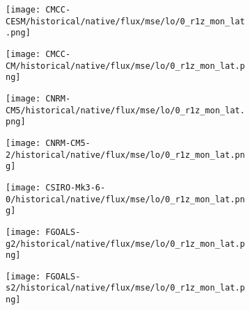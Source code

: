 \documentclass[preview]{standalone}
\begin{document}
\begin{figure}
  \begin{subfigure}[t]{\textwidth}
    \texttt{[image: CMCC-CESM/historical/native/flux/mse/lo/0\_r1z\_mon\_lat.png]}
  \end{subfigure}
\end{figure}

\begin{figure}
  \begin{subfigure}[t]{\textwidth}
    \texttt{[image: CMCC-CM/historical/native/flux/mse/lo/0\_r1z\_mon\_lat.png]}
  \end{subfigure}
\end{figure}

\begin{figure}
  \begin{subfigure}[t]{\textwidth}
    \texttt{[image: CNRM-CM5/historical/native/flux/mse/lo/0\_r1z\_mon\_lat.png]}
  \end{subfigure}
\end{figure}

\begin{figure}
  \begin{subfigure}[t]{\textwidth}
    \texttt{[image: CNRM-CM5-2/historical/native/flux/mse/lo/0\_r1z\_mon\_lat.png]}
  \end{subfigure}
\end{figure}

\begin{figure}
  \begin{subfigure}[t]{\textwidth}
    \texttt{[image: CSIRO-Mk3-6-0/historical/native/flux/mse/lo/0\_r1z\_mon\_lat.png]}
  \end{subfigure}
\end{figure}

\begin{figure}
  \begin{subfigure}[t]{\textwidth}
    \texttt{[image: FGOALS-g2/historical/native/flux/mse/lo/0\_r1z\_mon\_lat.png]}
  \end{subfigure}
\end{figure}

\begin{figure}
  \begin{subfigure}[t]{\textwidth}
    \texttt{[image: FGOALS-s2/historical/native/flux/mse/lo/0\_r1z\_mon\_lat.png]}
  \end{subfigure}
\end{figure}
\end{document}
